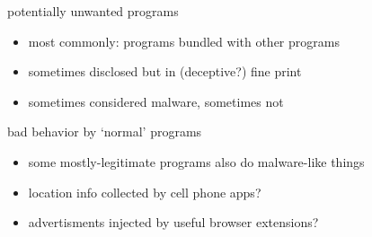 \begin{frame}{potentially unwanted programs}
    \begin{itemize}
    \item most commonly: programs bundled with other programs
    \item sometimes disclosed but in (deceptive?) fine print
    \item sometimes considered malware, sometimes not
    \end{itemize}
\end{frame}

\begin{frame}{bad behavior by `normal' programs}
    \begin{itemize}
    \item some mostly-legitimate programs also do malware-like things
    \vspace{.5cm}
    \item location info collected by cell phone apps?
    \item advertisments injected by useful browser extensions?
    \end{itemize}
\end{frame}


{ %
    \begin{frame}[plain]
    \end{frame}
}
